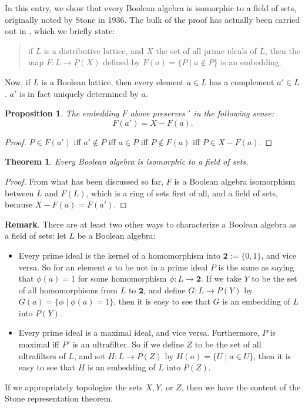 \documentclass[12pt]{article}
\newtheorem{prop}{Proposition}
\newtheorem{thm}{Theorem}
\begin{document}
In this entry, we show that every Boolean algebra is isomorphic to a field of sets, originally noted by Stone in 1936.  The bulk of the proof has actually been carried out in , which we briefly state:
\begin{quote}
if $L$ is a distributive lattice, and $X$ the set of all prime ideals of $L$, then the map $F:L\to P(X)$ defined by $F(a)=\lbrace P\mid a\notin P\rbrace$ is an embedding.
\end{quote}

Now, if $L$ is a Boolean lattice, then every element $a\in L$ has a complement $a'\in L$.  $a'$ is in fact uniquely determined by $a$.

\begin{prop} The embedding $F$ above preserves $'$ in the following sense: $$F(a')=X-F(a).$$ \end{prop}
\begin{proof} $P\in F(a')$ iff $a'\notin P$ iff $a\in P$ iff $P\notin F(a)$ iff $P\in X-F(a)$.  \end{proof}

\begin{thm} Every Boolean algebra is isomorphic to a field of sets. \end{thm}
\begin{proof} From what has been discussed so far, $F$ is a Boolean algebra isomorphism between $L$ and $F(L)$, which is a ring of sets first of all, and a field of sets, because $X-F(a)=F(a')$.  \end{proof}

\textbf{Remark}.  There are at least two other ways to characterize a Boolean algebra as a field of sets: let $L$ be a Boolean algebra:
\begin{itemize}
\item Every prime ideal is the kernel of a homomorphism into $\boldsymbol{2}:=\lbrace 0,1\rbrace$, and vice versa.  So for an element $a$ to be not in a prime ideal $P$ is the same as saying that $\phi(a)=1$ for some homomorphism $\phi:L \to \boldsymbol{2}$.  If we take $Y$ to be the set of all homomorphisms from $L$ to $\boldsymbol{2}$, and define $G:L\to P(Y)$ by $G(a)=\lbrace \phi \mid \phi(a)=1 \rbrace$, then it is easy to see that $G$ is an embedding of $L$ into $P(Y)$.
\item Every prime ideal is a maximal ideal, and vice versa.  Furthermore, $P$ is maximal iff $P'$ is an ultrafilter.  So if we define $Z$ to be the set of all ultrafilters of $L$, and set $H:L\to P(Z)$ by $H(a)=\lbrace U\mid a\in U\rbrace$, then it is easy to see that $H$ is an embedding of $L$ into $P(Z)$.
\end{itemize}
If we appropriately topologize the sets $X,Y$, or $Z$, then we have the content of the Stone representation theorem.
\end{document}
